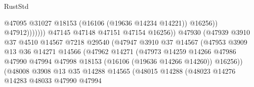 \begin{lexlean}{RustStd}
\begin{coremodule}
                                                      @47095
                                                      @31027
                                                      @18153
                                                      (@16106 (@19636 @14234 @14221))
                                                      @16256))
                                                  @47912)))))))
                                    @47145
                                    @47148
                                    @47151
                                    @47154
                                    @16256))
                                @47930
                                (@47939
                                  @3910
                                  @37
                                  @4510
                                  @14567
                                  @7218
                                  @29540
                                  (@47947
                                    @3910
                                    @37
                                    @14567
                                    (@47953
                                      @3909
                                      @13
                                      @36
                                      @14271
                                      @14566
                                      (@47962
                                        @14271
                                        (@47973
                                          @14259
                                          @14266
                                          @47986
                                          @47990
                                          @47994
                                          @47998
                                          @18153
                                          (@16106 (@19636 @14266 @14260))
                                          @16256))
                                      (@48008
                                        @3908
                                        @13
                                        @35
                                        @14288
                                        @14565
                                        (@48015
                                          @14288
                                          (@48023
                                            @14276
                                            @14283
                                            @48033
                                            @47990
                                            @47994

\end{coremodule}
\end{lexlean}
